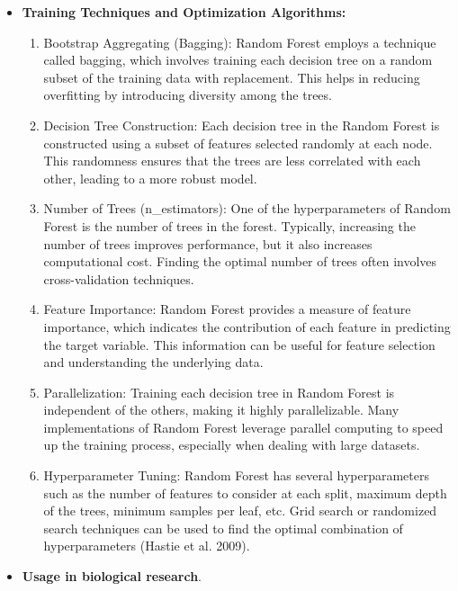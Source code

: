 \begin{itemize}
\item
  \textbf{Training Techniques and Optimization Algorithms:}

  \begin{enumerate}
  \item
    Bootstrap Aggregating (Bagging): Random Forest employs a technique
    called bagging, which involves training each decision tree on a
    random subset of the training data with replacement. This helps in
    reducing overfitting by introducing diversity among the trees.
  \item
    Decision Tree Construction: Each decision tree in the Random Forest
    is constructed using a subset of features selected randomly at each
    node. This randomness ensures that the trees are less correlated
    with each other, leading to a more robust model.
  \item
    Number of Trees (n\_estimators): One of the hyperparameters of
    Random Forest is the number of trees in the forest. Typically,
    increasing the number of trees improves performance, but it also
    increases computational cost. Finding the optimal number of trees
    often involves cross-validation techniques.
  \item
    Feature Importance: Random Forest provides a measure of feature
    importance, which indicates the contribution of each feature in
    predicting the target variable. This information can be useful for
    feature selection and understanding the underlying data.
  \item
    Parallelization: Training each decision tree in Random Forest is
    independent of the others, making it highly parallelizable. Many
    implementations of Random Forest leverage parallel computing to
    speed up the training process, especially when dealing with large
    datasets.
  \item
    Hyperparameter Tuning: Random Forest has several hyperparameters
    such as the number of features to consider at each split, maximum
    depth of the trees, minimum samples per leaf, etc. Grid search or
    randomized search techniques can be used to find the optimal
    combination of hyperparameters (Hastie et al. 2009).
  \end{enumerate}
\end{itemize}

\begin{itemize}
\item
  \textbf{Usage in biological research}.
\end{itemize}

